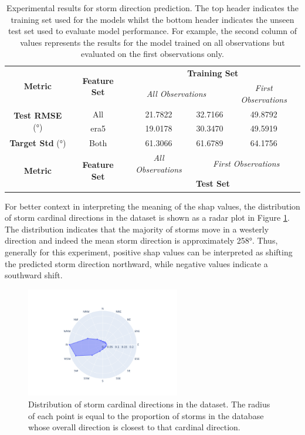 \begin{table}[ht]
\centering
\caption{Experimental results for storm direction prediction. The top header indicates the training set used for the models whilst the bottom header indicates the unseen test set used to evaluate model performance. For example, the second column of values represents the results for the model trained on all observations but evaluated on the first observations only.}
\label{tab:storm_direction_results}
\begin{tabular}{|c|c|c|c|c|}
\hline
\multirow{2}{*}{\textbf{Metric}} & \multirow{2}{*}{\textbf{Feature Set}} & \multicolumn{3}{c|}{\textbf{Training Set} } \\ \cline{3-5}
 & & \multicolumn{2}{c|}{\textit{All Observations}} & \textit{First Observations} \\
\hline \hline
\multirow{2}{*}{\textbf{Test RMSE} (\unit{\degree})} & All & 21.7822 & 32.7166 & 49.8792 \\
 & \acrshort{era5} & 19.0178 & 30.3470 & 49.5919 \\
\hline
\textbf{Target Std} (\unit{\degree}) & Both & 61.3066 & 61.6789 & 64.1756 \\
\hline \hline
\multirow{2}{*}{\textbf{Metric}} & \multirow{2}{*}{\textbf{Feature Set}} & \textit{All Observations} & \multicolumn{2}{c|}{\textit{First Observations}} \\ \cline{3-5}
 & & \multicolumn{3}{c|}{\textbf{Test Set}} \\ 
\hline
\end{tabular}
\end{table}

For better context in interpreting the meaning of the \acrshort{shap} values, the distribution of storm cardinal directions in the dataset is shown as a radar plot in Figure \ref{fig:storm_cardinal_directions_distribution}. The distribution indicates that the majority of storms move in a westerly direction and indeed the mean storm direction is approximately \ang{258}. Thus, generally for this experiment, positive \acrshort{shap} values can be interpreted as shifting the predicted storm direction northward, while negative values indicate a southward shift.

\begin{figure}[ht]
    \centering
    \includegraphics[width=0.6\textwidth]{../figures/generated/exploration/storm_cardinal_directions_distribution.png}
    \caption{Distribution of storm cardinal directions in the dataset. The radius of each point is equal to the proportion of storms in the database whose overall direction is closest to that cardinal direction.}
    \label{fig:storm_cardinal_directions_distribution}
\end{figure}

